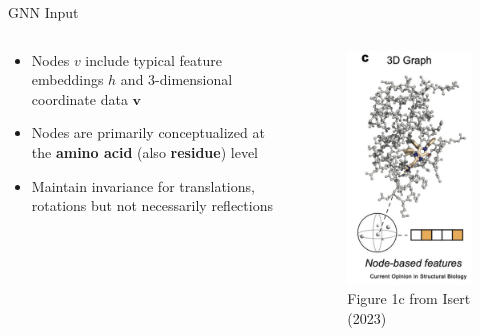 \documentclass{beamer}
\newcommand{\node}{v}
\newcommand{\nrepresent}{h}
\begin{document}
\begin{frame}{GNN Input}
    \begin{columns}
        \begin{column}{0.65\textwidth}
            \begin{itemize}\setlength\itemsep{6mm}
                \item Nodes $\node$ include typical feature embeddings $\nrepresent$ and 3-dimensional coordinate data $\mathbf\node$
                \item Nodes are primarily conceptualized at the {\bf amino acid} (also {\bf residue}) level
                \item Maintain invariance for translations, rotations but not necessarily reflections 
            \end{itemize}            
        \end{column}
        \begin{column}{0.35\textwidth}
            \begin{figure}
                \centering 
                \includegraphics[scale=0.55]{Isert_2023_ModelsSBDD_3DGraph.png}
            \caption{Figure 1c from Isert (2023) \cite{isert_structure-based_2023}}
        \end{figure}
                    
        \end{column}
    \end{columns}
\end{frame}
\end{document}
